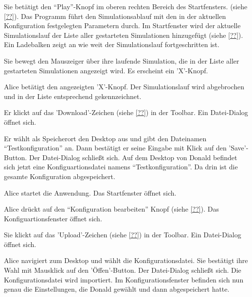 \documentclass[parskip=full,11pt,twoside]{scrartcl}
\begin{document}
{Sie betätigt den \enquote{Play}-Knopf im oberen rechten Bereich des Startfensters. (siehe \cref{??}).}
{Das Programm führt den Simulationsablauf mit den in der aktuellen Konfiguration festgelegten Parametern durch. Im Startfenster wird der aktuelle Simulationslauf der Liste aller gestarteten Simulationen hinzugefügt (siehe \cref{??}). Ein Ladebalken zeigt an wie weit der Simulationslauf fortgeschritten ist.}

{Sie bewegt den Mauszeiger über ihre laufende Simulation, die in der Liste aller gestarteten Simulationen angezeigt wird.}
{Es erscheint ein 'X'-Knopf.}

\teststep{}
{Alice betätigt den angezeigten 'X'-Knopf.}
{Der Simulationslauf wird abgebrochen und in der Liste entsprechend gekennzeichnet.}


{Er klickt auf das 'Download'-Zeichen (siehe \cref{??}) in der Toolbar.}
{Ein Datei-Dialog öffnet sich.}

{Er wählt als Speicherort den Desktop aus und gibt den Dateinamen \enquote{Testkonfiguration} an. Dann bestätigt er seine Eingabe mit Klick auf den 'Save'-Button.}
{Der Datei-Dialog schließt sich. Auf dem Desktop von Donald befindet sich jetzt eine Konfiguartionsdatei namens \enquote{Testkonfiguration}. Da drin ist die gesamte Konfiguration abgespeichert.}

{Alice startet die Anwendung.}
{Das Startfenster öffnet sich.}

{Alice drückt auf den \enquote{Konfiguration bearbeiten} Knopf (siehe \cref{??}).}
{Das Konfiguartionsfenster öffnet sich.}

{Sie klickt auf das 'Upload'-Zeichen (siehe \cref{??}) in der Toolbar.}
{Ein Datei-Dialog öffnet sich.}

\teststep{}
{Alice navigiert zum Desktop und wählt die Konfigurationsdatei. Sie bestätigt ihre Wahl mit Mausklick auf den 'Öffen'-Button.}
{Der Datei-Dialog schließt sich. Die Konfigurationsdatei wird importiert. Im Konfigurationsfenster befinden sich nun genau die Einstellungen, die Donald gewählt und dann abgespeichert hatte.}
\end{document}
